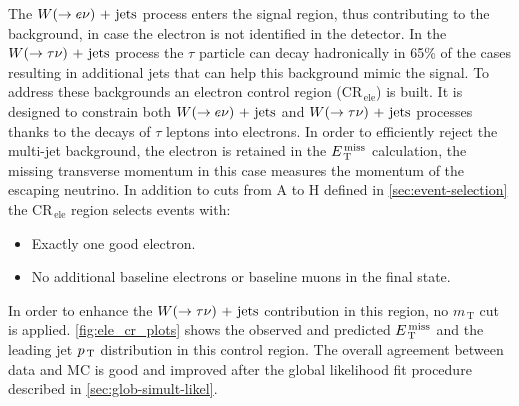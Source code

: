 The $W (\rightarrow e \nu)\mathrm{~+~jets}$ process enters the signal region, thus contributing to the
background, in case the electron is not identified in the detector. In the
$W (\rightarrow \tau \nu)\mathrm{~+~jets}$ process the $\tau$ particle can decay hadronically in 65\% of
the cases resulting in additional jets that can help this background mimic the
signal. To address these backgrounds an electron control region
(CR$_\mathrm{\, ele}$) is built. It is designed to constrain both
$W (\rightarrow e \nu)\mathrm{~+~jets}$ and $W (\rightarrow \tau \nu)\mathrm{~+~jets}$ processes thanks to the decays of $\tau$
leptons into electrons. In order to efficiently reject the multi-jet background,
the electron is retained in the $E_\mathrm{\, T}^\mathrm{\, miss}$ calculation, the missing transverse
momentum in this case measures the momentum of the escaping neutrino. In
addition to cuts from A to H defined in \cref{sec:event-selection} the
CR$_\mathrm{\, ele}$ region selects events with:
\begin{itemize}
\item Exactly one good electron.
\item No additional baseline electrons or baseline muons in the final state.
\end{itemize}
In order to enhance the $W (\rightarrow \tau \nu)\mathrm{~+~jets}$ contribution in this region, no
$m_\mathrm{\, T}$ cut is applied.
\cref{fig:ele_cr_plots}
shows the observed and predicted $E_\mathrm{\, T}^\mathrm{\, miss}$ and the leading jet $p_\mathrm{\, T}$ distribution
in this control region. The overall agreement between data and MC is good and
improved after the global likelihood fit procedure described in
\cref{sec:glob-simult-likel}.
